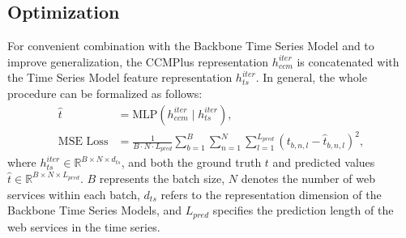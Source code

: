 \subsection{Optimization}
\label{sec:optimize}
For convenient combination with the Backbone Time Series Model and to improve generalization, the CCMPlus representation \( h_{ccm}^{iter} \) is concatenated with the Time Series Model feature representation \( h_{ts}^{iter} \). In general, the whole procedure can be formalized as follows:
{\small
\begin{align}
\hat{t} &= \text{MLP}\left(h_{ccm}^{iter} \mid h_{ts}^{iter}\right),\nonumber\\
\text{MSE Loss} &= \frac{1}{B \cdot N \cdot L_{pred}} \sum_{b=1}^{B} \sum_{n=1}^{N} \sum_{l=1}^{L_{pred}} \left( t_{b, n, l} - \hat{t}_{b, n, l} \right)^2,
\label{eq:mse_loss_overall}
\end{align}
}
where $ h_{ts}^{iter} \in \mathbb{R}^{B\times N\times d_{ts}} $, and both the ground truth \( t \) and predicted values $ \hat{t} \in \mathbb{R}^{B\times N\times L_{pred}} $. \( B \) represents the batch size, \( N \) denotes the number of web services within each batch, \( d_{ts} \) refers to the representation dimension of the Backbone Time Series Models, and \( L_{pred} \) specifies the prediction length of the web services in the time series.















